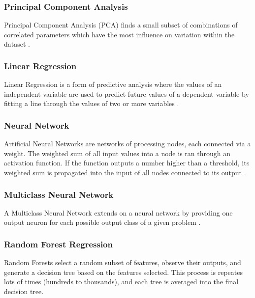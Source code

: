 \documentclass[a4paper,titlepage]{article}
\begin{document}
\subsubsection*{Principal Component Analysis}
Principal Component Analysis (PCA) finds a small subset of combinations of correlated parameters which have the most influence on variation within the dataset \cite{einasto2011}.
\subsubsection*{Linear Regression}
Linear Regression is a form of predictive analysis where the values of an independent variable are used to predict future values of a dependent variable by fitting a line through the values of two or more variables \cite{davison2003}.
\subsubsection*{Neural Network}
Artificial Neural Networks are networks of processing nodes, each connected via a weight.
The weighted sum of all input values into a node is ran through an activation function.
If the function outputs a number higher than a threshold, its weighted sum is propagated into the input of all nodes connected to its output \cite{hardesty2017}.
\subsubsection*{Multiclass Neural Network}
A Multiclass Neural Network extends on a neural network by providing one output neuron for each possible output class of a given problem \cite{multiclassnn}.
\subsubsection*{Random Forest Regression}
Random Forests select a random subset of features, observe their outputs, and generate a decision tree based on the features selected.
This process is repeates lots of times (hundreds to thousands), and each tree is averaged into the final decision tree. \cite{hastie2017}
\end{document}
